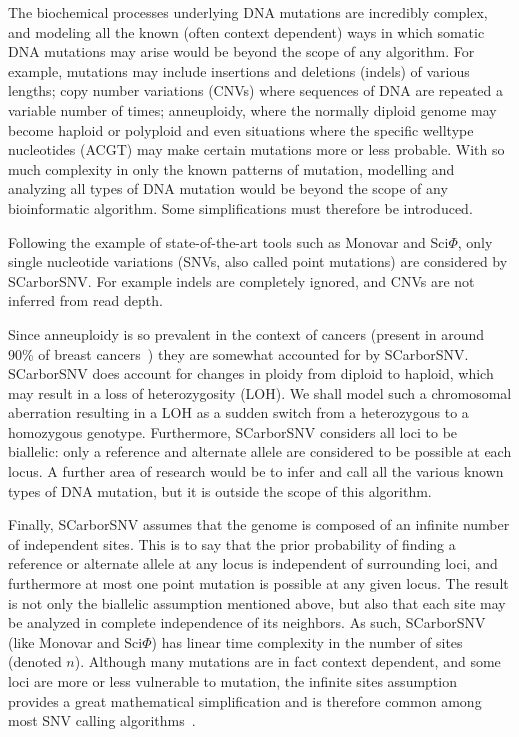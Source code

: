 \documentclass[../../main.tex]{subfiles}
\begin{document}
The biochemical processes underlying DNA mutations are incredibly complex, and modeling all the known (often context dependent) ways in which somatic DNA mutations may arise would be beyond the scope of any algorithm.
For example, mutations may include insertions and deletions (indels) of various lengths; copy number variations (CNVs) where sequences of DNA are repeated a variable number of times; anneuploidy, where the normally diploid genome may become haploid or polyploid and even situations where the specific welltype nucleotides (ACGT) may make certain mutations more or less probable\cite{monovar, 21breasts, 21breasts2, metastatic, gao2016punctuated}.
With so much complexity in only the known patterns of mutation, modelling and analyzing all types of DNA mutation would be beyond the scope of any bioinformatic algorithm.
Some simplifications must therefore be introduced.

Following the example of state-of-the-art tools such as Monovar and Sci$\Phi$, only single nucleotide variations (SNVs, also called point mutations) are considered by SCarborSNV.
For example indels are completely ignored, and CNVs are not inferred from read depth.

Since anneuploidy is so prevalent in the context of cancers (present in around 90\% of breast cancers~\cite{gao2016punctuated}) they are somewhat accounted for by SCarborSNV.
SCarborSNV does account for changes in ploidy from diploid to haploid, which may result in a loss of heterozygosity (LOH).
We shall model such a chromosomal aberration resulting in a LOH as a sudden switch from a heterozygous to a homozygous genotype.
Furthermore, SCarborSNV considers all loci to be biallelic: only a reference and alternate allele are considered to be possible at each locus.
A further area of research would be to infer and call all the various known types of DNA mutation, but it is outside the scope of this algorithm.

Finally, SCarborSNV assumes that the genome is composed of an infinite number of independent sites.
This is to say that the prior probability of finding a reference or alternate allele at any locus is independent of surrounding loci, and furthermore at most one point mutation is possible at any given locus.
The result is not only the biallelic assumption mentioned above, but also that each site may be analyzed in complete independence of its neighbors.
As such, SCarborSNV (like Monovar and Sci$\Phi$) has linear time complexity in the number of sites (denoted $n$).
Although many mutations are in fact context dependent, and some loci are more or less vulnerable to mutation, the infinite sites assumption provides a great mathematical simplification and is therefore common among most SNV calling algorithms~\cite{greenman2007patterns, 21breasts2, alexandrov2013signatures}.
\end{document}
